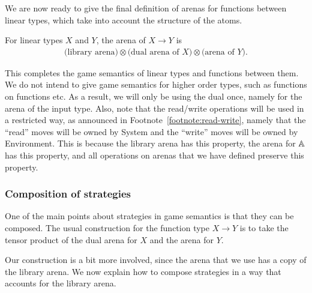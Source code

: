 We are now ready to give the final definition of arenas for functions between linear types, which take into account the structure of the atoms.

\begin{definition} For linear types $X$ and $Y$, the arena of $X \to Y$ is 
    \begin{align*}
    \text{(library arena)} \otimes \text{(dual arena of $X$)} \otimes \text{(arena of $Y$)}.
    \end{align*}
\end{definition}

This completes the game semantics of linear types and functions between them. We do not intend to give game semantics for higher order types, such as functions on functions etc. As a result, we will only be using the dual once, namely for the arena of the input type. Also, note that the read/write operations will be used in a restricted way, as announced in Footnote~\ref{footnote:read-write}, namely that the ``read'' moves will be owned by System and the ``write'' moves will be owned by Environment.  This is because the library arena has this property, the arena for $\mathbb A$ has this property, and all operations on arenas that we have defined preserve this property.

\subsubsection{Composition of strategies}
\label{sec:composition-of-strategies}
One of the main points about strategies in game semantics is that they can be composed.
The usual construction for the function type $X \to Y$ is to take the tensor product of the dual arena for $X$ and the arena for $Y$. 

Our construction is a bit more involved, since the arena that we use has a copy of the library arena. We now explain how to compose strategies in a way that accounts for the library arena. 

